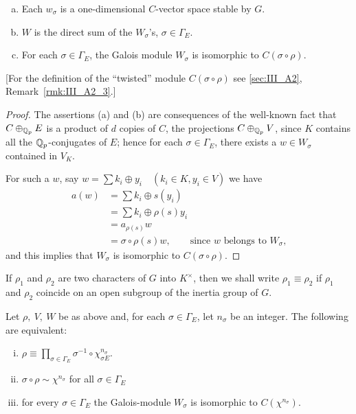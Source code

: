 \begin{subappendices}
\begin{lem}\label{lem:III_A5_1}
\begin{enumerate}[(a)]
	\item Each $w_\sigma$ is a one-dimensional $C$-vector space stable by
$G$.
	\item $W$ is the direct sum of the $W_\sigma$'s, $\sigma \in \Gamma_E$.
	\item For each $\sigma \in \Gamma_E$, the Galois module $W_\sigma$ is
isomorphic to $C(\sigma \circ \rho)$.
\end{enumerate}
\end{lem}

[For the definition of the ``twisted'' module $C(\sigma \circ \rho)$ see
\ref{sec:III_A2}, Remark~\ref{rmk:III_A2_3}.]

\begin{proof}
The assertions (a) and (b) are consequences of the well-known fact that $C
\oplus_{\mathbb{Q}_p} E$ is a product of $d$ copies of $C$, the projections $C
\oplus_{\mathbb{Q}_p} V$, since $K$ contains all the $\mathbb{Q}_p$-conjugates of $E$; hence for
each $\sigma \in \Gamma_E$, there exists a $w \in W_\sigma$ contained in $V_K$.
\dpage

For such a $w$, say $w = \sum k_i \oplus y_i \quad (k_i \in K, y_i \in V)$ we
have
\begin{align*}
	a(w) &= \sum k_i \oplus s(y_i)\\
	&= \sum k_i \oplus \rho(s)y_i\\
	&= a_{\rho(s)}w\\
	&= \sigma \circ \rho(s)w, \qquad \text{since $w$ belongs to $W_\sigma$,}
\end{align*}
and this implies that $W_\sigma$ is isomorphic to $C(\sigma \circ \rho)$.
\end{proof}

If $\rho_1$ and $\rho_2$ are two characters of $G$ into $K^\times$, then we shall
write $\rho_1 \equiv \rho_2$ if $\rho_1$ and $\rho_2$ coincide on an open
subgroup of the inertia group of $G$.

\begin{thm}\label{thm:III_A5_2}
Let $\rho,~V,~W$ be as above and, for each $\sigma \in \Gamma_E$, let $n_\sigma$
be an integer. The following are equivalent:
\begin{enumerate}[(i), series=thm_IIIA5_2]
	\item\label{thm:III_A5_2i}
		$\rho \equiv \prod_{\sigma \in \Gamma_E} \sigma^{-1} \circ
\chi_{\sigma E}^{n_\sigma}$.
	\item\label{thm:III_A5_2ii}
		$\sigma \circ \rho \sim \chi^{n_\sigma}$ for all $\sigma \in
\Gamma_E$
	\item\label{thm:III_A5_2iii}
		for every $\sigma \in \Gamma_E$ the Galois-module $W_\sigma$ is
isomorphic to $C(\chi^{n_\sigma})$.
\end{enumerate}
\end{thm}


\end{subappendices}
